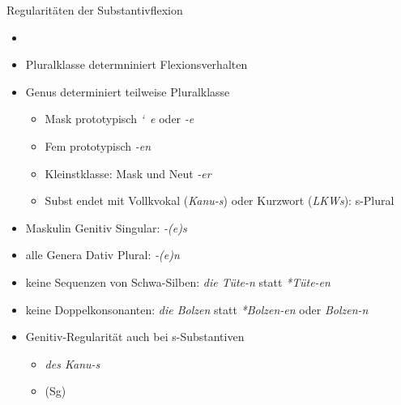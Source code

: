 \begin{frame}
  {Regularitäten der Substantivflexion}
  \pause
  \begin{itemize}[<+->]
    \item {}
    \item \alert{Pluralklasse determniniert Flexionsverhalten}
    \item Genus determiniert teilweise Pluralklasse
      \begin{itemize}[<+->]
        \item \alert{Mask prototypisch \textit{\char`~e} oder \textit{-e}}
        \item \alert{Fem prototypisch \textit{-en}}
        \item Kleinstklasse: Mask und Neut \textit{-er}
        \item Subst endet mit Vollkvokal (\textit{Kanu-s}) oder Kurzwort (\textit{LKWs}): s-Plural
      \end{itemize}
    \Halbzeile
  \item \alert{Maskulin Genitiv Singular: \textit{-(e)s}} 
    \item \alert{alle Genera Dativ Plural: \textit{-(e)n}}
    \item keine Sequenzen von Schwa-Silben: \textit{die Tüte-n} statt \textit{*Tüte-en}
    \item keine Doppelkonsonanten: \textit{die Bolzen} statt \textit{*Bolzen-en} oder \textit{Bolzen-n}
      \Halbzeile
    \item Genitiv-Regularität auch bei s-Substantiven
      \begin{itemize}[<+->]
        \item \textit{des Kanu-s}
        \item {} (Sg)
      \end{itemize}
  \end{itemize}
\end{frame}

